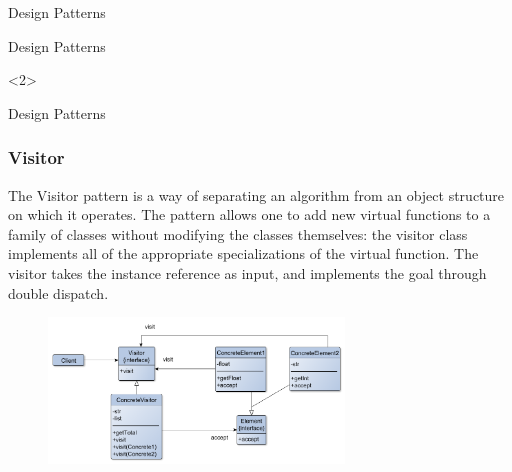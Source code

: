 \documentclass{beamer}
\begin{document}
\begin{section}{Design Patterns}
\begin{subsection}{Design Patterns}
\begin{frame}
		
		<2>

	
	\end{frame}
\end{subsection}

\begin{subsection}{Design Patterns}
	\begin{frame}
		\frametitle{Visitor}
The Visitor pattern is a way of separating an algorithm from an object structure on which it operates. {\footnotesize The pattern allows one to add new virtual functions to a family of classes without modifying the classes themselves: the visitor class implements all of the appropriate specializations of the virtual function. The visitor takes the instance reference as input, and implements the goal through double dispatch.}
		
\begin{figure}[!h]
	\centering
	\includegraphics[width=0.7\textwidth]{./Visitor/ClassDiagram.png}
	\label{ViclassDiag}
\end{figure}
		

\end{frame}
\end{subsection}
\end{section}
\end{document}
